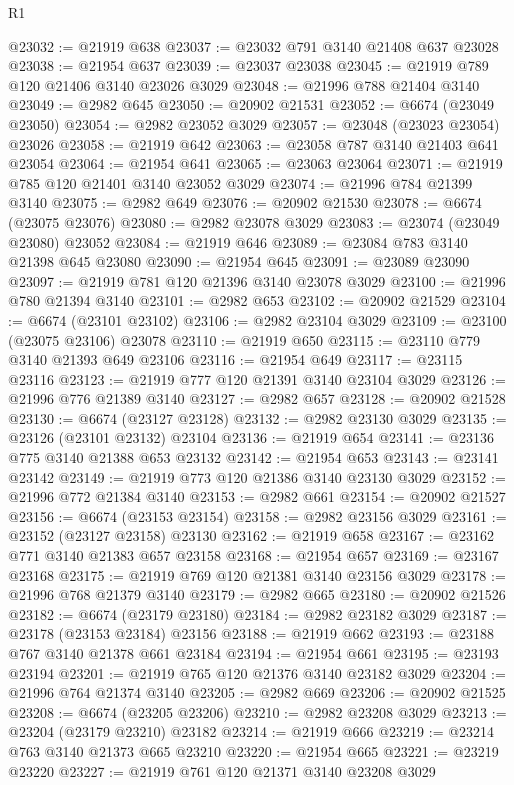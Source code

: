 \begin{lexlean}{R1}
\begin{coremodule}
@23032 := @21919 @638
@23037 := @23032 @791 @3140 @21408 @637 @23028
@23038 := @21954 @637
@23039 := @23037 @23038
@23045 := @21919 @789 @120 @21406 @3140 @23026 @3029
@23048 := @21996 @788 @21404 @3140
@23049 := @2982 @645
@23050 := @20902 @21531
@23052 := @6674 (@23049 @23050)
@23054 := @2982 @23052 @3029
@23057 := @23048 (@23023 @23054) @23026
@23058 := @21919 @642
@23063 := @23058 @787 @3140 @21403 @641 @23054
@23064 := @21954 @641
@23065 := @23063 @23064
@23071 := @21919 @785 @120 @21401 @3140 @23052 @3029
@23074 := @21996 @784 @21399 @3140
@23075 := @2982 @649
@23076 := @20902 @21530
@23078 := @6674 (@23075 @23076)
@23080 := @2982 @23078 @3029
@23083 := @23074 (@23049 @23080) @23052
@23084 := @21919 @646
@23089 := @23084 @783 @3140 @21398 @645 @23080
@23090 := @21954 @645
@23091 := @23089 @23090
@23097 := @21919 @781 @120 @21396 @3140 @23078 @3029
@23100 := @21996 @780 @21394 @3140
@23101 := @2982 @653
@23102 := @20902 @21529
@23104 := @6674 (@23101 @23102)
@23106 := @2982 @23104 @3029
@23109 := @23100 (@23075 @23106) @23078
@23110 := @21919 @650
@23115 := @23110 @779 @3140 @21393 @649 @23106
@23116 := @21954 @649
@23117 := @23115 @23116
@23123 := @21919 @777 @120 @21391 @3140 @23104 @3029
@23126 := @21996 @776 @21389 @3140
@23127 := @2982 @657
@23128 := @20902 @21528
@23130 := @6674 (@23127 @23128)
@23132 := @2982 @23130 @3029
@23135 := @23126 (@23101 @23132) @23104
@23136 := @21919 @654
@23141 := @23136 @775 @3140 @21388 @653 @23132
@23142 := @21954 @653
@23143 := @23141 @23142
@23149 := @21919 @773 @120 @21386 @3140 @23130 @3029
@23152 := @21996 @772 @21384 @3140
@23153 := @2982 @661
@23154 := @20902 @21527
@23156 := @6674 (@23153 @23154)
@23158 := @2982 @23156 @3029
@23161 := @23152 (@23127 @23158) @23130
@23162 := @21919 @658
@23167 := @23162 @771 @3140 @21383 @657 @23158
@23168 := @21954 @657
@23169 := @23167 @23168
@23175 := @21919 @769 @120 @21381 @3140 @23156 @3029
@23178 := @21996 @768 @21379 @3140
@23179 := @2982 @665
@23180 := @20902 @21526
@23182 := @6674 (@23179 @23180)
@23184 := @2982 @23182 @3029
@23187 := @23178 (@23153 @23184) @23156
@23188 := @21919 @662
@23193 := @23188 @767 @3140 @21378 @661 @23184
@23194 := @21954 @661
@23195 := @23193 @23194
@23201 := @21919 @765 @120 @21376 @3140 @23182 @3029
@23204 := @21996 @764 @21374 @3140
@23205 := @2982 @669
@23206 := @20902 @21525
@23208 := @6674 (@23205 @23206)
@23210 := @2982 @23208 @3029
@23213 := @23204 (@23179 @23210) @23182
@23214 := @21919 @666
@23219 := @23214 @763 @3140 @21373 @665 @23210
@23220 := @21954 @665
@23221 := @23219 @23220
@23227 := @21919 @761 @120 @21371 @3140 @23208 @3029

\end{coremodule}
\end{lexlean}
